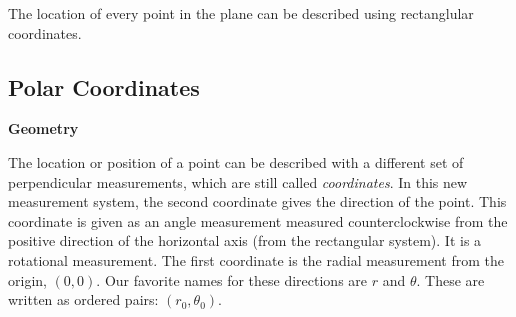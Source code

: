 \documentclass{ximera}
\begin{document}
\begin{image}
\end{image}



\qquad

The location of every point in the plane can be described using rectanglular coordinates.








\subsection*{Polar Coordinates}

\textbf{\textcolor{purple!85!blue}{Geometry}} 



The location or position of a point can be described with a different set of perpendicular measurements, which are still called \textit{coordinates}.  In this new measurement system, the second coordinate gives the direction of the point. This coordinate is given as an angle measurement measured counterclockwise from the positive direction of the horizontal axis (from the rectangular system). It is a rotational measurement.  The first coordinate is the radial measurement from the origin, $(0,0)$. Our favorite names for these directions are $r$ and $\theta$. These are written as ordered pairs: $(r_0, \theta_0)$.
\end{document}
